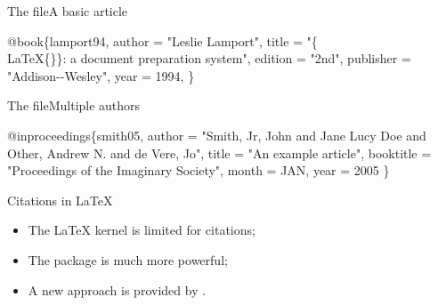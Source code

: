\begin{frame}[fragile]{The \BibTeX{} file}{A basic article}

  \begin{example}
    \begin{semiverbatim}
\alert<2>{@book}\{\alert<3>{lamport94},
   author    = "Leslie Lamport",
   title     = 
     "\alert<4>{\{\\LaTeX\{\}\}}: a document preparation system",
   edition   = "2nd",
   publisher = "Addison-{}-Wesley",
   year      = \alert<5>{1994},
\}
    \end{semiverbatim}
  \end{example}

\end{frame}

\begin{frame}[fragile]{The \BibTeX{} file}{Multiple authors}

  \begin{example}
    \begin{semiverbatim}
@inproceedings\{smith05,
  author    = "Smith, Jr, John \alert<2>{and} Jane Lucy Doe
   \alert<2>{and} Other, Andrew N. \alert<2>{and} de Vere, Jo",
  title     = "An example article",
  booktitle = "Proceedings of the Imaginary Society",
  month     = JAN,
  year      = 2005
\}
    \end{semiverbatim}
  \end{example}

\end{frame}

\begin{frame}[fragile]{Citations in \LaTeX{}}

  \begin{itemize}
    \item The \LaTeX{} kernel is limited for citations;
    \item The  package is much more powerful;
    \item A new approach is provided by .
  \end{itemize}

\end{frame}

